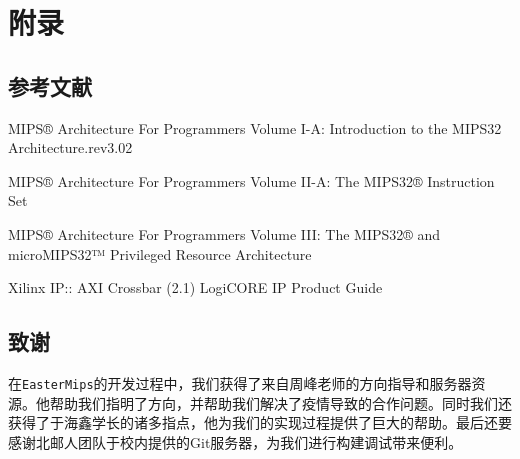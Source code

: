 \chapter{附录}

\section{参考文献}
MIPS® Architecture For Programmers Volume I-A: Introduction to the MIPS32 Architecture.rev3.02

MIPS® Architecture For Programmers Volume II-A: The MIPS32® Instruction Set 

MIPS® Architecture For Programmers Volume III: The MIPS32® and microMIPS32™ Privileged Resource Architecture 

Xilinx IP:: AXI Crossbar (2.1) LogiCORE IP Product Guide

\section{致谢}

在\texttt{EasterMips}的开发过程中，我们获得了来自周峰老师的方向指导和服务器资源。他帮助我们指明了方向，并帮助我们解决了疫情导致的合作问题。同时我们还获得了于海鑫学长的诸多指点，他为我们的实现过程提供了巨大的帮助。最后还要感谢北邮人团队于校内提供的Git服务器，为我们进行构建调试带来便利。